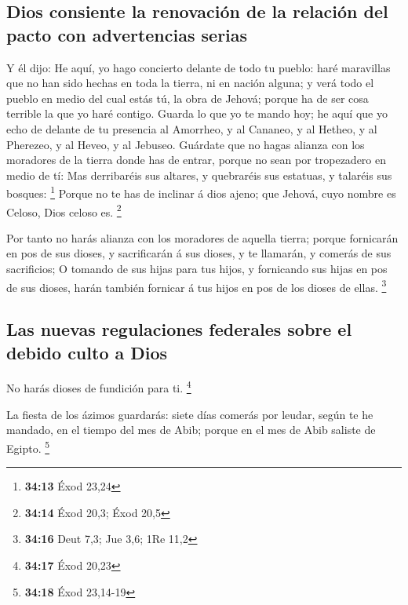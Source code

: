 \hypertarget{dios-consiente-la-renovaciuxf3n-de-la-relaciuxf3n-del-pacto-con-advertencias-serias}{%
\subsection{Dios consiente la renovación de la relación del pacto con
advertencias
serias}\label{dios-consiente-la-renovaciuxf3n-de-la-relaciuxf3n-del-pacto-con-advertencias-serias}}

 Y él dijo: He aquí, yo hago concierto delante de todo tu
pueblo: haré maravillas que no han sido hechas en toda la tierra, ni en
nación alguna; y verá todo el pueblo en medio del cual estás tú, la obra
de Jehová; porque ha de ser cosa terrible la que yo haré contigo.
 Guarda lo que yo te mando hoy; he aquí que yo echo de
delante de tu presencia al Amorrheo, y al Cananeo, y al Hetheo, y al
Pherezeo, y al Heveo, y al Jebuseo.  Guárdate que no hagas
alianza con los moradores de la tierra donde has de entrar, porque no
sean por tropezadero en medio de tí:  Mas derribaréis sus
altares, y quebraréis sus estatuas, y talaréis sus bosques: \footnote{\textbf{34:13}
  Éxod 23,24}  Porque no te has de inclinar á dios ajeno;
que Jehová, cuyo nombre es Celoso, Dios celoso es. \footnote{\textbf{34:14}
  Éxod 20,3; Éxod 20,5}

 Por tanto no harás alianza con los moradores de aquella
tierra; porque fornicarán en pos de sus dioses, y sacrificarán á sus
dioses, y te llamarán, y comerás de sus sacrificios;  O
tomando de sus hijas para tus hijos, y fornicando sus hijas en pos de
sus dioses, harán también fornicar á tus hijos en pos de los dioses de
ellas. \footnote{\textbf{34:16} Deut 7,3; Jue 3,6; 1Re 11,2}

\hypertarget{las-nuevas-regulaciones-federales-sobre-el-debido-culto-a-dios}{%
\subsection{Las nuevas regulaciones federales sobre el debido culto a
Dios}\label{las-nuevas-regulaciones-federales-sobre-el-debido-culto-a-dios}}

 No harás dioses de fundición para ti. \footnote{\textbf{34:17}
  Éxod 20,23}

 La fiesta de los ázimos guardarás: siete días comerás por
leudar, según te he mandado, en el tiempo del mes de Abib; porque en el
mes de Abib saliste de Egipto. \footnote{\textbf{34:18} Éxod 23,14-19}

